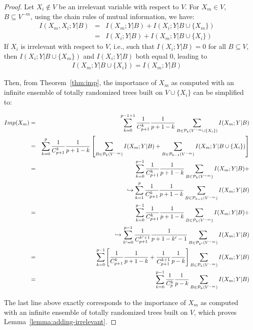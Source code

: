\documentclass{article}
\begin{document}
\begin{proof}
Let $X_i \notin V$ be an irrelevant variable with respect to $V$. For $X_m \in
V$, $B \subseteq V^{-m}$, using the chain rules of mutual information, we have:
\begin{eqnarray*}
I(X_m, X_i;Y|B) &=& I(X_m;Y|B) + I(X_i;Y|B \cup \{X_m\}) \\
                &=& I(X_i;Y|B) + I(X_m;Y|B \cup \{X_i\})
\end{eqnarray*}
If $X_i$ is irrelevant with respect to $V$, i.e., such that $I(X_i;Y|B)=0$ for
all $B\subseteq V$, then $I(X_i;Y|B \cup \{X_m\})$ and $I(X_i;Y|B)$ both equal
$0$, leading to
\begin{eqnarray*}
I(X_m;Y|B \cup \{X_i\}) = I(X_m;Y|B)
\end{eqnarray*}

Then, from Theorem~\ref{thm:imp}, the importance of $X_m$ as computed with an
infinite ensemble of totally randomized trees built on $V\cup \{X_i\}$ can be
simplified to:

\begin{eqnarray*}
  Imp(X_m)&=&\sum_{k=0}^{p-1+1} \frac{1}{C_{p+1}^k} \frac{1}{p+1-k} \sum_{B \in {\cal P}_k(V^{-m} \cup \{X_i\})} I(X_m;Y|B)\\
          &=&\sum_{k=0}^{p} \frac{1}{C_{p+1}^k} \frac{1}{p+1-k} \left[ \sum_{B \in {\cal P}_k(V^{-m})} I(X_m;Y|B) + \sum_{B \in {\cal P}_{k-1}(V^{-m})} I(X_m;Y|B \cup \{X_i\})  \right] \\
          &=&\sum_{k=0}^{p-1} \frac{1}{C_{p+1}^k} \frac{1}{p+1-k} \sum_{B \in {\cal P}_k(V^{-m})} I(X_m;Y|B) + \\
          & &\hookrightarrow \sum_{k=1}^{p} \frac{1}{C_{p+1}^k} \frac{1}{p+1-k} \sum_{B \in {\cal P}_{k-1}(V^{-m})} I(X_m;Y|B)\\
          &=&\sum_{k=0}^{p-1} \frac{1}{C_{p+1}^k} \frac{1}{p+1-k} \sum_{B \in {\cal P}_k(V^{-m})} I(X_m;Y|B) + \\
          & &\hookrightarrow \sum_{k'=0}^{p-1} \frac{1}{C_{p+1}^{k'+1}} \frac{1}{p+1-k'-1} \sum_{B \in {\cal P}_{k'}(V^{-m})} I(X_m;Y|B)\\
          &=&\sum_{k=0}^{p-1} \left[ \frac{1}{C_{p+1}^k} \frac{1}{p+1-k} + \frac{1}{C_{p+1}^{k+1}} \frac{1}{p-k} \right] \sum_{B \in {\cal P}_k(V^{-m})} I(X_m;Y|B)\\
          &=&\sum_{k=0}^{p-1} \frac{1}{C^k_p} \frac{1}{p-k} \sum_{B \in {\cal P}_k(V^{-m})} I(X_m;Y|B)\\
\end{eqnarray*}

The last line above exactly corresponds to the importance of $X_m$ as computed
with an infinite ensemble of totally randomized trees built on $V$, which proves
Lemma~\ref{lemma:adding-irrelevant}.
\end{proof}
\end{document}
